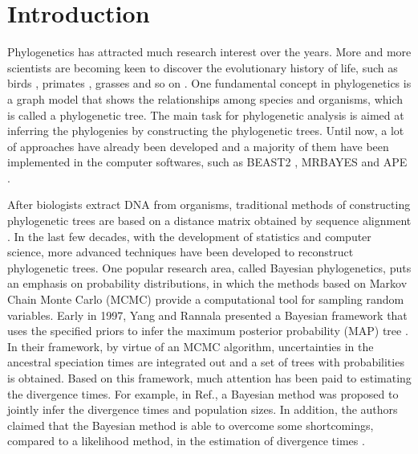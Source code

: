 \documentclass{bmcart}
\begin{document}

\section*{Introduction}
Phylogenetics has attracted much research interest over the years. More and more scientists are becoming keen to discover the evolutionary history of life, such as birds \cite{hackett2008phylogenomic}, primates \cite{szalay2013evolutionary}, grasses \cite{kellogg2001evolutionary} and so on \cite{sawabe2007inferring,garnery1992evolutionary}. One fundamental concept in phylogenetics is a graph model that shows the relationships among species and organisms, which is called a phylogenetic tree. The main task for phylogenetic analysis is aimed at inferring the phylogenies by constructing the phylogenetic trees. Until now, a lot of approaches have already been developed and a majority of them have been implemented in the computer softwares, such as BEAST2 \cite{drummond2007beast, bouckaert2014beast} , MRBAYES \cite{huelsenbeck2001mrbayes} and APE \cite{paradis2004ape}.

After biologists extract DNA from organisms, traditional methods of constructing phylogenetic trees are based on a distance matrix obtained by sequence alignment \cite{farris1972estimating,nei1983accuracy,saitou1987neighbor}. In the last few decades, with the development of statistics and computer science, more advanced techniques have been developed to reconstruct phylogenetic trees. One popular research area, called Bayesian phylogenetics, puts an emphasis on probability distributions, in which the methods based on Markov Chain Monte Carlo (MCMC) provide a computational tool for sampling random variables. Early in 1997, Yang and Rannala presented a Bayesian framework that uses the specified priors to infer the maximum posterior probability (MAP) tree \cite{yang1997bayesian}. In their framework, by virtue of an MCMC algorithm, uncertainties in the ancestral speciation times are integrated out and a set of trees with probabilities is obtained. Based on this framework, much attention has been paid to estimating the divergence times. For example, in Ref.\cite{rannala2003bayes}, a Bayesian method was proposed to jointly infer the divergence times and population sizes. In addition, the authors claimed that the Bayesian method is able to overcome some shortcomings, compared to a likelihood method, in the estimation of divergence times \cite{yang2003comparison}. 
\end{document}
